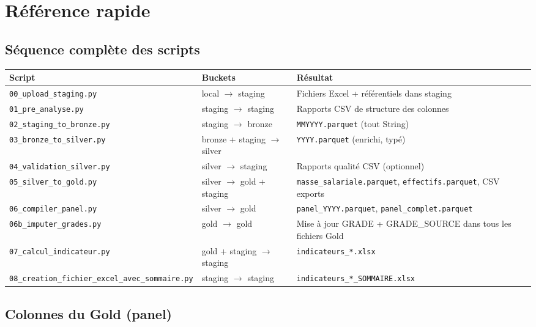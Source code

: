 \documentclass[12pt,a4paper,french]{report}
\begin{document}
\chapter{Référence rapide}

\section{Séquence complète des scripts}

\begin{tabularx}{\textwidth}{llX}
  \toprule
  \textbf{Script} & \textbf{Buckets} & \textbf{Résultat} \\
  \midrule
  \texttt{00\_upload\_staging.py} &
    local $\rightarrow$ staging &
    Fichiers Excel + référentiels dans staging \\
  \texttt{01\_pre\_analyse.py} &
    staging $\rightarrow$ staging &
    Rapports CSV de structure des colonnes \\
  \texttt{02\_staging\_to\_bronze.py} &
    staging $\rightarrow$ bronze &
    \texttt{MMYYYY.parquet} (tout String) \\
  \texttt{03\_bronze\_to\_silver.py} &
    bronze + staging $\rightarrow$ silver &
    \texttt{YYYY.parquet} (enrichi, typé) \\
  \texttt{04\_validation\_silver.py} &
    silver $\rightarrow$ staging &
    Rapports qualité CSV (optionnel) \\
  \texttt{05\_silver\_to\_gold.py} &
    silver $\rightarrow$ gold + staging &
    \texttt{masse\_salariale.parquet},
    \texttt{effectifs.parquet}, CSV exports \\
  \texttt{06\_compiler\_panel.py} &
    silver $\rightarrow$ gold &
    \texttt{panel\_YYYY.parquet},
    \texttt{panel\_complet.parquet} \\
  \texttt{06b\_imputer\_grades.py} &
    gold $\rightarrow$ gold &
    Mise à jour GRADE + GRADE\_SOURCE dans tous les fichiers Gold \\
  \texttt{07\_calcul\_indicateur.py} &
    gold + staging $\rightarrow$ staging &
    \texttt{indicateurs\_*.xlsx} \\
  \texttt{08\_creation\_fichier\_excel\_avec\_sommaire.py} &
    staging $\rightarrow$ staging &
    \texttt{indicateurs\_*\_SOMMAIRE.xlsx} \\
  \bottomrule
\end{tabularx}

\section{Colonnes du Gold (panel)}
\end{document}
